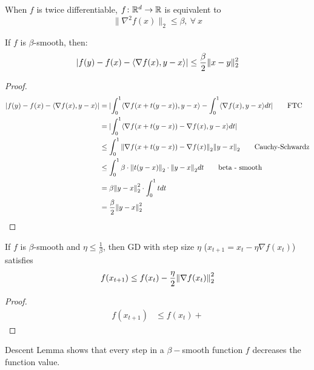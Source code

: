 \begin{remark}
    When \(f\) is twice differentiable, \(f \colon \mathbb{R}^d \to \mathbb{R}\) is equivalent to 
    \[
        \lVert \nabla^2 f(x)\rVert_2 \leq \beta, \ \forall \ x   
    \]
\end{remark}

\begin{lemma}
    If \(f\) is \(\beta\)-smooth, then: 
    \[
        \lvert  f(y) - f(x) - \langle \nabla f(x), y - x \rangle \rvert  \leq \frac{\beta}{2} \lVert x - y\rVert_2^2  
    \]
\end{lemma}


\begin{proof}
    \begin{align*}
        \lvert f(y) - f(x) - \langle \nabla f(x),  y - x  \rangle \rvert 
        &= \lvert  \int_0^1 \langle \nabla f(x + t(y-x)), y - x \rangle - \int_0^1 \langle \nabla f(x), y-x \rangle dt \rvert \tag*{FTC} \\ 
        &= \lvert \int_0^1 \langle \nabla f(x + t(y-x)) - \nabla f(x), y-x \rangle dt \rvert \\ 
        &\leq \int_0^1 \norm{\nabla f(x + t(y-x)) - \nabla f(x)}_2 \norm{y-x}_2 \tag*{Cauchy-Schwardz} \\ 
        &\leq \int_0^1 \beta \cdot \norm{t(y-x)}_2 \cdot \norm{y-x}_2 dt \tag*{beta - smooth}  \\ 
        &= \beta \norm{y-x}_2^2 \cdot \int_0^1 t dt \\ 
        &= \frac{\beta}{2} \norm{y-x}_2^2 
    \end{align*}
\end{proof}


\begin{lemma}
    If \(f\) is \(\beta\)-smooth and \(\eta \leq \frac{1}{\beta}\), then GD with 
    step size \(\eta\) (\(x_{t+1} = x_t - \eta \nabla f(x_t)\)) satisfies 
    \[
        f(x_{t+1}) \leq f(x_t) - \frac{\eta}{2} \norm{\nabla f(x_t)}_2^2 
    \]
\end{lemma}

\begin{proof}
    \begin{align*}
        f(x_{t+1}) &\leq f(x_t) +
    \end{align*}
\end{proof}


\begin{remark}
    Descent Lemma shows that every step in a \(\beta-\)smooth function \(f\) decreases 
    the function value. 
\end{remark}


